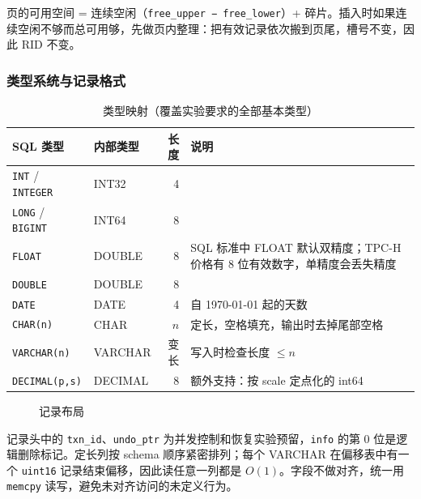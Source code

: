 \documentclass[11pt,a4paper]{ctexart}
\newcommand{\code}[1]{\texttt{#1}}
\begin{document}
页的可用空间 = 连续空闲（\code{free\_upper − free\_lower}）+ 碎片。插入时如果连续空闲不够而总可用够，先做页内整理：把有效记录依次搬到页尾，槽号不变，因此 RID 不变。

\subsubsection{类型系统与记录格式}

\begin{table}[H]
  \centering
  \caption{类型映射（覆盖实验要求的全部基本类型）}
  \begin{tabularx}{\textwidth}{l l r X}
    \toprule
    SQL 类型 & 内部类型 & 长度 & 说明 \\
    \midrule
    \code{INT} / \code{INTEGER} & INT32 & 4 & \\
    \code{LONG} / \code{BIGINT} & INT64 & 8 & \\
    \code{FLOAT} & DOUBLE & 8 & SQL 标准中 FLOAT 默认双精度；TPC-H 价格有 8 位有效数字，单精度会丢失精度 \\
    \code{DOUBLE} & DOUBLE & 8 & \\
    \code{DATE} & DATE & 4 & 自 1970-01-01 起的天数 \\
    \code{CHAR(n)} & CHAR & $n$ & 定长，空格填充，输出时去掉尾部空格 \\
    \code{VARCHAR(n)} & VARCHAR & 变长 & 写入时检查长度 $\leq n$ \\
    \code{DECIMAL(p,s)} & DECIMAL & 8 & 额外支持：按 scale 定点化的 int64 \\
    \bottomrule
  \end{tabularx}
\end{table}

\begin{figure}[H]
  \centering
  \caption{记录布局}
\end{figure}

记录头中的 \code{txn\_id}、\code{undo\_ptr} 为并发控制和恢复实验预留，\code{info} 的第 0 位是逻辑删除标记。定长列按 schema 顺序紧密排列；每个 VARCHAR 在偏移表中有一个 \code{uint16} 记录结束偏移，因此读任意一列都是 $O(1)$。字段不做对齐，统一用 \code{memcpy} 读写，避免未对齐访问的未定义行为。
\end{document}

